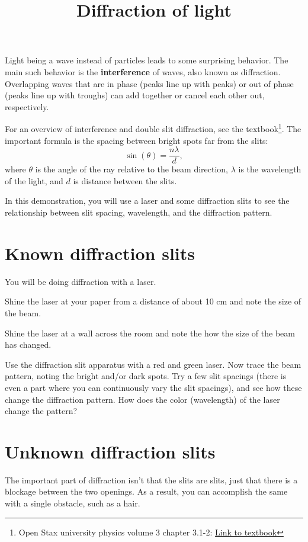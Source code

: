 \documentclass[phy1200]{handout}
\title{Diffraction of light}
\begin{document}
\maketitle

Light being a wave instead of particles leads to some surprising behavior. The main such behavior is the \textbf{interference} of waves, also known as diffraction. Overlapping waves that are in phase (peaks line up with peaks) or out of phase (peaks line up with troughs) can add together or cancel each other out, respectively. 

For an overview of interference and double slit diffraction, see the textbook\footnote{Open Stax university physics volume 3 chapter 3.1-2: \href{https://openstax.org/books/university-physics-volume-3/pages/3-1-youngs-double-slit-interference}{Link to textbook}}. The important formula is the spacing between bright spots far from the slits:
$$
\sin(\theta) = \frac{n\lambda}{d},
$$
where $\theta$ is the angle of the ray relative to the beam direction, $\lambda$ is the wavelength of the light, and $d$ is distance between the slits.

In this demonstration, you will use a laser and some diffraction slits to see the relationship between slit spacing, wavelength, and the diffraction pattern.

\section{Known diffraction slits}
You will be doing diffraction with a laser.

Shine the laser at your paper from a distance of about 10 cm and note the size of the beam. 

Shine the laser at a wall across the room and note the how the size of the beam has changed.

Use the diffraction slit apparatus with a red and green laser. Now trace the beam pattern, noting the bright and/or dark spots. Try a few slit spacings (there is even a part where you can continuously vary the slit spacings), and see how these change the diffraction pattern. How does the color (wavelength) of the laser change the pattern? 

\section{Unknown diffraction slits}
The important part of diffraction isn't that the slits are slits, just that there is a blockage between the two openings. As a result, you can accomplish the same with a single obstacle, such as a hair. 
\end{document}
